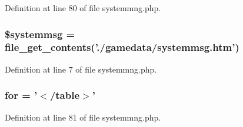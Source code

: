 Definition at line 80 of file systemmng.\+php.

\hypertarget{systemmng_8php_a55ca8f809e3f66df41dedfdc9e85649e}{
\subsubsection[{\$systemmsg}]{\setlength{\rightskip}{0pt plus 5cm}\$systemmsg = file\+\_\+get\+\_\+contents('./gamedata/systemmsg.\+htm')}}\label{systemmng_8php_a55ca8f809e3f66df41dedfdc9e85649e}


Definition at line 7 of file systemmng.\+php.

\hypertarget{systemmng_8php_ac32536c54e0519a86f3c262e8f882bd9}{
\subsubsection[{for}]{\setlength{\rightskip}{0pt plus 5cm}for = '$<$/table$>$'}}\label{systemmng_8php_ac32536c54e0519a86f3c262e8f882bd9}


Definition at line 81 of file systemmng.\+php.


